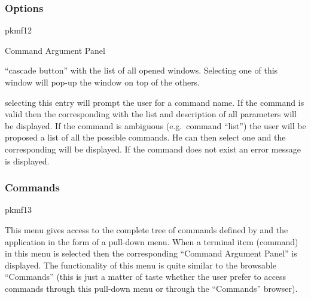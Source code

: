 \subsubsection*{Options}
\begin{PICTf}[.3] {pkmf12}
\end{PICTf}
\vspace{.5\baselineskip}
\begin{DLsf}{Command Argument Panel}
\item[Raise Window]
     ``cascade button'' with the list of all
     opened windows. Selecting one of this window will pop-up the
     window on top of the others.
\item[Command Argument Panel]
     selecting this entry will
     prompt the user for a command name. If the command is valid
     then the corresponding \CAP{} with the list
     and description of all parameters will be displayed. If the
     command is ambiguous (e.g.\ command ``list'') the user
     will be proposed a list of all the possible commands. He can
     then select one and the corresponding \CAP{} will be displayed.
     If the command does not exist an error message is displayed.
\end{DLsf}


\subsubsection*{Commands}
\begin{PICTf}[.6] {pkmf13}
\begin{DLsf}{}
\item[]
  This menu gives access to the complete tree
  of commands defined by \KUIP{} and the application in the form
  of a pull-down menu. When a terminal item (command) in this
  menu is selected then the corresponding ``Command Argument
  Panel'' is displayed. The functionality of this menu is quite
  similar to the browsable ``Commands'' (this is just a matter of
  taste whether the user prefer to access commands through this
  pull-down menu or through the ``Commands'' browser).
\end{DLsf}
\end{PICTf}

